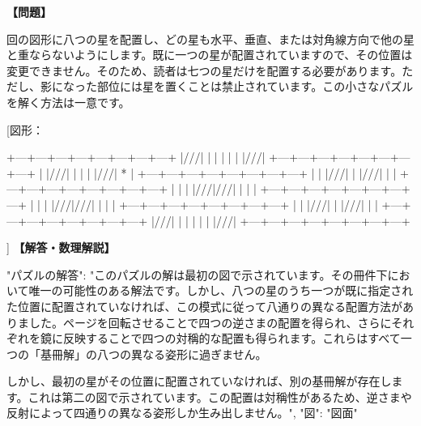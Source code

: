 \documentclass[10pt,a4paper,oneside,openany]{ltjsbook}
\begin{document}
\begin{tcolorbox}[colback=softblue,colframe=primaryblue,title=\textbf{第 301 問：THE EIGHT STARS.},arc=2mm,boxrule=1pt,breakable]
\textbf{【問題】}\par\vspace{0.3em}
回の図形に八つの星を配置し、どの星も水平、垂直、または対角線方向で他の星と重ならないようにします。既に一つの星が配置されていますので、その位置は変更できません。そのため、読者は七つの星だけを配置する必要があります。ただし、影になった部位には星を置くことは禁止されています。この小さなパズルを解く方法は一意です。

[図形：

    +---+---+---+---+---+---+---+---+
    |///|   |   |   |   |   |   |///|
    +---+---+---+---+---+---+---+---+
    |   |///|   |   |   |   |///| * |
    +---+---+---+---+---+---+---+---+
    |   |   |///|   |   |///|   |   |
    +---+---+---+---+---+---+---+---+
    |   |   |   |///|///|   |   |   |
    +---+---+---+---+---+---+---+---+
    |   |   |   |///|///|   |   |   |
    +---+---+---+---+---+---+---+---+
    |   |   |///|   |   |///|   |   |
    +---+---+---+---+---+---+---+---+
    |///|   |   |   |   |   |   |///|
    +---+---+---+---+---+---+---+---+

]
\tcblower
\textbf{【解答・数理解説】}\par\vspace{0.3em}
{
"パズルの解答": "このパズルの解は最初の図で示されています。その冊件下において唯一の可能性のある解法です。しかし、八つの星のうち一つが既に指定された位置に配置されていなければ、この模式に従って八通りの異なる配置方法がありました。ページを回転させることで四つの逆さまの配置を得られ、さらにそれぞれを鏡に反映することで四つの対稱的な配置も得られます。これらはすべて一つの「基冊解」の八つの異なる姿形に過ぎません。

しかし、最初の星がその位置に配置されていなければ、別の基冊解が存在します。これは第二の図で示されています。この配置は対稱性があるため、逆さまや反射によって四通りの異なる姿形しか生み出しません。",
"図": "図面"
}
\end{tcolorbox}
\end{document}
